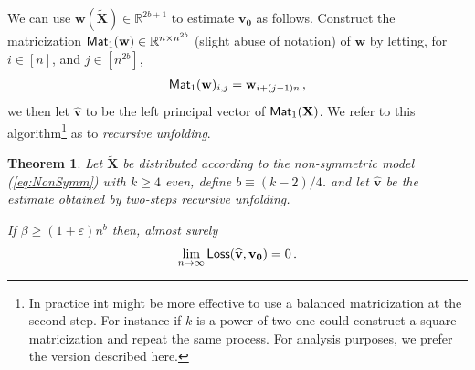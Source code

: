 \documentclass[11pt]{article}
\newtheorem{theorem}{Theorem}
\theoremstyle{definition}
\def\Loss{{\sf Loss}}
\def\reals{\mathbb{R}}
\def\hbv{\mathbf{\widehat{v}}}
\def\bw{\mathbf{w}}
\def\bvz{\mathbf{v_0}}
\def\bX{\mathbf{X}}
\def\btX{\mathbf{\widetilde{X}}}
\def\M{{\sf Mat}}
\def\eps{\varepsilon}
\begin{document}
We can use $\bw(\btX)\in\reals^{2b+1}$ to estimate $\bvz$ as follows. 
Construct the matricization $\M_1(\bw)\in\reals^{n\times n^{2b}}$
(slight abuse of notation) of
$\bw$ by letting, for $i\in [n]$, and $j\in [n^{2b}]$,
%
\begin{align}
%
\M_1(\bw)_{i,j} = \bw_{i+(j-1)n}\, ,\label{eq:M1w}
%
\end{align}
%
we then let $\hbv$ to be the left principal vector of $\M_1(\bX)$.
We refer to this algorithm\footnote{In practice int might be more
  effective to use a balanced matricization at the second step. For
  instance if $k$ is a power of two one could construct a square
  matricization and repeat the same process. For analysis purposes, we
prefer the version described here.} as to \emph{recursive unfolding}.
%
\begin{theorem}\label{th:unfoldNonsymm}
Let $\btX$ be distributed according to the non-symmetric model
(\ref{eq:NonSymm}) with $k\ge 4$ even, define $b \equiv (k-2)/4$. 
and let $\hbv$ be the estimate obtained by two-steps recursive
unfolding. 

%
If $\beta\ge (1+\eps) n^{b}$ then, almost surely
%
\begin{align}
%
\lim_{n\to\infty}\Loss(\hbv,\bvz)  =0\, . \label{eq:LossUBNons}
%
\end{align}
%
%
\end{theorem}
%
\end{document}
